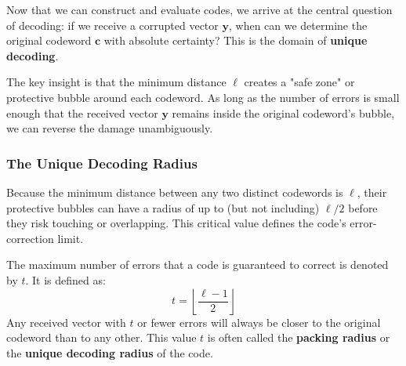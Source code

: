 \documentclass{article}
\begin{document}
Now that we can construct and evaluate codes, we arrive at the central question of decoding: if we receive a corrupted vector $\mathbf{y}$, when can we determine the original codeword $\mathbf{c}$ with absolute certainty? This is the domain of \textbf{unique decoding}.

The key insight is that the minimum distance $\ell$ creates a "safe zone" or protective bubble around each codeword. As long as the number of errors is small enough that the received vector $\mathbf{y}$ remains inside the original codeword's bubble, we can reverse the damage unambiguously.

\subsubsection{The Unique Decoding Radius}
Because the minimum distance between any two distinct codewords is $\ell$, their protective bubbles can have a radius of up to (but not including) $\ell/2$ before they risk touching or overlapping. This critical value defines the code's error-correction limit.

The maximum number of errors that a code is guaranteed to correct is denoted by $t$. It is defined as:
\[
t = \left\lfloor \frac{\ell - 1}{2} \right\rfloor
\]
Any received vector with $t$ or fewer errors will always be closer to the original codeword than to any other. This value $t$ is often called the \textbf{packing radius} or the \textbf{unique decoding radius} of the code.
\end{document}
